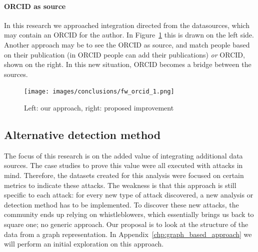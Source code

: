 \documentclass{ou-report}
\newcommand{\todo}[1]{{\color{red} TODO: #1}}
\newcommand{\orcid}{ORCID}
\begin{document}
\paragraph{ORCID as source}
In this research we approached integration directed from the datasources, which
may contain an \orcid{} for the author. In Figure~\ref{fig:fw_orcid_1} this is 
drawn on the left side. Another approach may be to see the \orcid{}
as source, and match people based on their publication (in \orcid{} people can 
add their publications) \textit{or} \orcid{}, shown on the right. In this new
situation, \orcid{} becomes a bridge between the sources.

\begin{figure}[H]
    \centering
    \texttt{[image: images/conclusions/fw\_orcid\_1.png]}
    \caption{Left: our approach, right: proposed improvement}
    \label{fig:fw_orcid_1}
\end{figure}

\subsection{Alternative detection method}
The focus of this research is on the added value of integrating additional data 
sources. The case studies to prove this value were all executed with attacks in 
mind. Therefore, the datasets created for this analysis were focused on certain 
metrics to indicate these attacks. 
The weakness is that this approach is
still specific to each attack: for every new type of attack discovered, a new
analysis or detection method has to be implemented. 
To discover these new attacks, the community ends up relying on whistleblowers, 
which essentially brings us back to square one; no generic approach.
Our proposal is to look at the structure of the data from a graph 
representation. In Appendix~\ref{chp:graph_based_approach} we will perform an
initial exploration on this approach.




\end{document}
